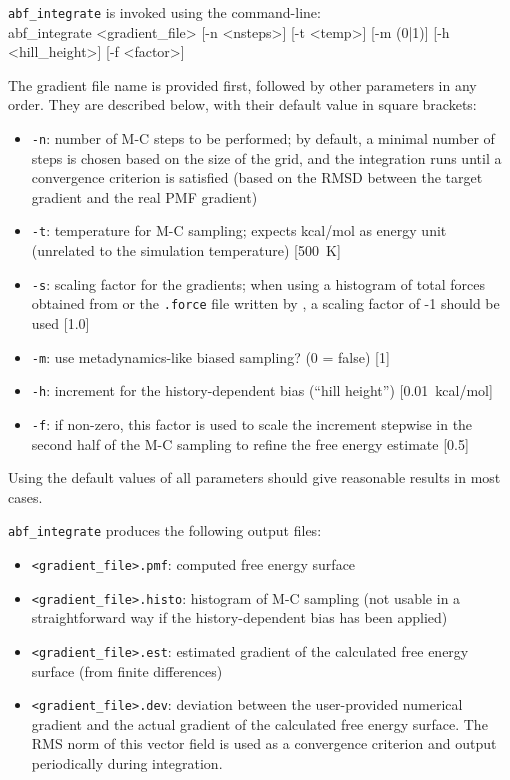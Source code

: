 \texttt{abf\_integrate} is invoked using the command-line:\\
{\small \noindent\ttfamily
abf\_integrate <gradient\_file> [-n <nsteps>] [-t <temp>] [-m (0|1)] [-h <hill\_height>] [-f <factor>]
}

The gradient file name is provided first, followed by other parameters in any order.
They are described below, with their default value in square brackets:
\begin{itemize}
\setlength{\itemsep}{0pt}
\item \texttt{-n}: number of M-C steps to be performed; by default, a minimal number of
steps is chosen based on the size of the grid, and the integration runs until a convergence
criterion is satisfied (based on the RMSD between the target gradient and the real PMF gradient)
\item \texttt{-t}: temperature for M-C sampling; expects kcal/mol as energy unit (unrelated to the simulation temperature)
  [500~K]
\item \texttt{-s}: scaling factor for the gradients; when using a histogram of total forces obtained from  or the \texttt{.force} file written by , a scaling factor of -1 should be used [1.0]
\item \texttt{-m}: use metadynamics-like biased sampling? (0 = false) [1]
\item \texttt{-h}: increment for the history-dependent bias (``hill height'') [0.01~kcal/mol]
\item \texttt{-f}: if non-zero, this factor is used to scale the increment stepwise in the
  second half of the M-C sampling to refine the free energy estimate [0.5]
\end{itemize}

Using the default values of all parameters should give reasonable results in most cases.

\bigskip
\texttt{abf\_integrate} produces the following output files:
\begin{itemize}
\setlength{\itemsep}{0pt}
\item \texttt{<gradient\_file>.pmf}: computed free energy surface
\item \texttt{<gradient\_file>.histo}: histogram of M-C sampling (not
usable in a straightforward way if the history-dependent bias has been applied)
\item \texttt{<gradient\_file>.est}: estimated gradient of the calculated free energy surface
(from finite differences)
\item \texttt{<gradient\_file>.dev}: deviation between the user-provided numerical gradient
and the actual gradient of the calculated free energy surface. The RMS norm of this vector
field is used as a convergence criterion and output periodically during integration.
\end{itemize}

